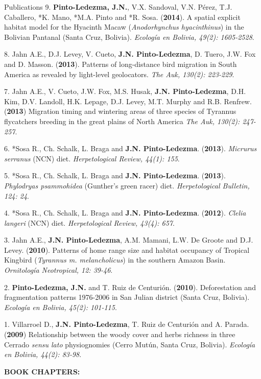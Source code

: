\documentclass{resume} %
\begin{document}
\begin{rSection}{Publications}
{9.} {\bf{Pinto-Ledezma, J.N.}}, {V.X. Sandoval, V.N. Pérez, T.J. Caballero, *K. Mano, *M.A. Pinto and *R. Sosa. ({{\bf 2014}}). A spatial explicit habitat model for the Hyacinth Macaw ({\em Anodorhynchus hyacinthinus}) in the Bolivian Pantanal (Santa Cruz, Bolivia).} {\em Ecología en Bolivia, 49(2): 1605-2528}.

{8.} {Jahn A.E., D.J. Levey, V. Cueto,} {\bf{J.N. Pinto-Ledezma}}, {D. Tuero, J.W. Fox and D. Masson. ({{\bf 2013}}). Patterns of long-distance bird migration in South America as revealed by light-level geolocators.} {\em The Auk, 130(2): 223-229}. 

{7.} {Jahn A.E., V. Cueto, J.W. Fox, M.S. Husak,} {\bf{J.N. Pinto-Ledezma}}, {D.H. Kim, D.V. Landoll, H.K. Lepage, D.J. Levey, M.T. Murphy and R.B. Renfrew. ({{\bf 2013}}) Migration timing and wintering areas of three species of Tyrannus flycatchers breeding in the great plains of North America} {\em The Auk, 130(2): 247-257}. 

{6.} {*Sosa R., Ch. Schalk, L. Braga and} {\bf{J.N. Pinto-Ledezma}}. {({{\bf 2013}}). {\em Micrurus serranus} (NCN) diet.} {\em Herpetological Review, 44(1): 155}. 

{5.} {*Sosa R., Ch. Schalk, L. Braga and} {\bf{J.N. Pinto-Ledezma}}. {({{\bf 2013}}). {\em Phylodryas psammohidea} (Gunther's green racer) diet.} {\em Herpetological Bulletin, 124: 24}. 

{4.} {*Sosa R., Ch. Schalk, L. Braga and} {\bf{J.N. Pinto-Ledezma}}. {({{\bf 2012}}). {\em Clelia langeri} (NCN) diet.} {\em Herpetological Review, 43(4): 657}. 

{3.} {Jahn A.E.,} {\bf{J.N. Pinto-Ledezma}}, {A.M. Mamani, L.W. De Groote and D.J. Levey. ({{\bf 2010}}). Patterns of home range size and habitat occupancy of Tropical Kingbird ({\em Tyrannus m. melancholicus}) in the southern Amazon Basin.} {\em Ornitología Neotropical, 12: 39-46}. 

{2.} {\bf{Pinto-Ledezma, J.N.}} {and T. Ruiz de Centurión. ({{\bf 2010}}). Deforestation and fragmentation patterns 1976-2006 in San Julian district (Santa Cruz, Bolivia).} {\em Ecología en Bolivia, 45(2): 101-115}.

{1.} {Villarroel D.,} {\bf{J.N. Pinto-Ledezma}}, { T. Ruiz de Centurión and A. Parada. ({{\bf 2009}}) Relationship between the woody cover and herbs richness in three Cerrado {\em sensu lato} physiognomies (Cerro Mutún, Santa Cruz, Bolivia).} {\em Ecología en Bolivia, 44(2): 83-98}. 

{\bf BOOK CHAPTERS:}


\end{rSection}
\end{document}
